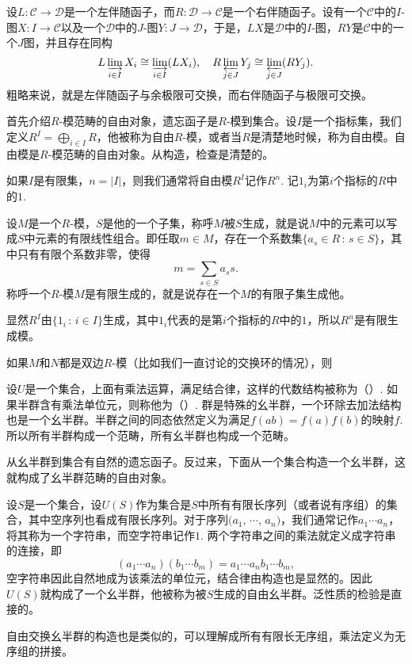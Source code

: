 \pro 设$L:\mathcal{C}\to \mathcal{D}$是一个左伴随函子，而$R:\mathcal{D}\to \mathcal{C}$是一个右伴随函子。设有一个$\mathcal{C}$中的$I$-图$X:I\to \mathcal{C}$以及一个$\mathcal{D}$中的$J$-图$Y:J\to \mathcal{D}$，于是，$LX$是$\mathcal{D}$中的$I$-图，$RY$是$\mathcal{C}$中的一个$J$图，并且存在同构
\[
	L\varinjlim_{i\in I} X_i\cong \varinjlim_{i\in I} (LX_i),\quad
	R\varprojlim_{j\in J} Y_j\cong \varprojlim_{j\in J} (RY_j).
\]
粗略来说，就是左伴随函子与余极限可交换，而右伴随函子与极限可交换。

\notprove

\para 首先介绍$R$-模范畴的自由对象，遗忘函子是$R$-模到集合。设$I$是一个指标集，我们定义$R^I=\bigoplus_{i\in I}R$，他被称为自由$R$-模，或者当$R$是清楚地时候，称为自由模。自由模是$R$-模范畴的自由对象。从构造，检查是清楚的。

如果$I$是有限集，$n=|I|$，则我们通常将自由模$R^I$记作$R^n$. 记$1_i$为第$i$个指标的$R$中的$1$.

\para 设$M$是一个$R$-模，$S$是他的一个子集，称呼$M$被$S$生成，就是说$M$中的元素可以写成$S$中元素的有限线性组合。即任取$m\in M$，存在一个系数集$\{a_s\in R\,:\, s\in S\}$，其中只有有限个系数非零，使得
\[
	m=\sum_{s\in S}a_s s.
\]
称呼一个$R$-模$M$是有限生成的，就是说存在一个$M$的有限子集生成他。

显然$R^I$由$\{1_i\,:\,i\in I\}$生成，其中$1_i$代表的是第$i$个指标的$R$中的$1$，所以$R^n$是有限生成模。

\para 如果$M$和$N$都是双边$R$-模（比如我们一直讨论的交换环的情况），则

\para 设$U$是一个集合，上面有乘法运算，满足结合律，这样的代数结构被称为（）. 如果半群含有乘法单位元，则称他为（）. 群是特殊的幺半群，一个环除去加法结构也是一个幺半群。半群之间的同态依然定义为满足$f(ab)=f(a)f(b)$的映射$f$. 所以所有半群构成一个范畴，所有幺半群也构成一个范畴。

从幺半群到集合有自然的遗忘函子。反过来，下面从一个集合构造一个幺半群，这就构成了幺半群范畴的自由对象。

设$S$是一个集合，设$U(S)$作为集合是$S$中所有有限长序列（或者说有序组）的集合，其中空序列也看成有限长序列。对于序列$(a_1$, $\cdots$, $a_n)$，我们通常记作$a_1\cdots a_n$，将其称为一个字符串，而空字符串记作$1$. 两个字符串之间的乘法就定义成字符串的连接，即
\[
	(a_1\cdots a_n)(b_1\cdots b_m)=a_1\cdots a_nb_1\cdots b_m,
\]
空字符串因此自然地成为该乘法的单位元，结合律由构造也是显然的。因此$U(S)$就构成了一个幺半群，他被称为被$S$生成的自由幺半群。泛性质的检验是直接的。

自由交换幺半群的构造也是类似的，可以理解成所有有限长无序组，乘法定义为无序组的拼接。

